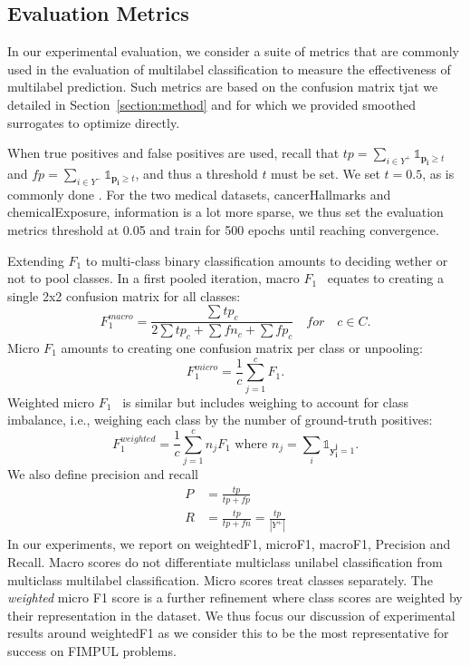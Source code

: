 \subsection{Evaluation Metrics}
\label{sec:evalMetrics}

In our experimental evaluation, we consider a suite of metrics that are commonly used in the evaluation of multilabel classification to measure the effectiveness of multilabel prediction. Such metrics are based on the confusion matrix tjat we detailed in Section~\ref{section:method} and for which we provided smoothed surrogates to optimize directly.

When true positives and false positives are used, recall that \(t p=\sum_{i \in Y^{+}} \mathds{1}_{\mathbf{p_i} \geq t}\) and \(f p=\sum_{i \in Y^{-}} \mathds{1}_{\mathbf{p_i} \geq t}\), and thus a threshold \(t\) must be set. We set \(t = 0.5\), as is commonly done .
For the two medical datasets, cancerHallmarks and chemicalExposure, information is a lot more sparse, we thus set the evaluation metrics threshold at 0.05 and train for 500 epochs until reaching convergence. 

Extending \(F_1\) to multi-class binary classification amounts to deciding wether or not to pool classes.
In a first pooled iteration, macro \(F_1\)~\cite{multilabelMetrics} equates to creating a single 2x2 confusion matrix for all classes:
\begin{equation}
F_1^{macro} = \frac{\sum tp_c}{2 \sum tp_c + \sum fn_c + \sum fp_c} \quad for \quad c \in C.
\end{equation}
Micro \(F_1\) \cite{threshForF1, multilabelMetrics} amounts to creating one confusion matrix per class or unpooling:
\begin{equation}
F_1^{micro} = \frac{1}{c} \sum_{j=1}^c F_1.
\end{equation}
Weighted micro \(F_1\)~\cite{weightedMetrics} is similar but includes weighing to account for class imbalance, i.e., weighing each class by the number of ground-truth positives:
\begin{equation}
F_1^{weighted} = \frac{1}{c} \sum_{j=1}^c n_j F_1 \text{ where } n_j = \sum_i \mathds{1}_{\mathbf{y_i^j} = 1}.
\end{equation}
%
We also define precision and recall
%
\begin{equation}
\begin{aligned} P &=\frac{t p}{t p+f p} \\ R &=\frac{t p}{t p+f n}=\frac{t p}{\left|Y^{+}\right|} \end{aligned}
\end{equation}
%
In our experiments, we report on weightedF1, microF1, macroF1, Precision and Recall. Macro scores do not differentiate multiclass unilabel classification from multiclass multilabel classification. Micro scores treat classes separately. The \emph{weighted} micro F1 score is a further refinement where class scores are weighted by their representation in the dataset. We thus focus our discussion of experimental results around weightedF1 as we consider this to be the most representative for success on FIMPUL problems. 

